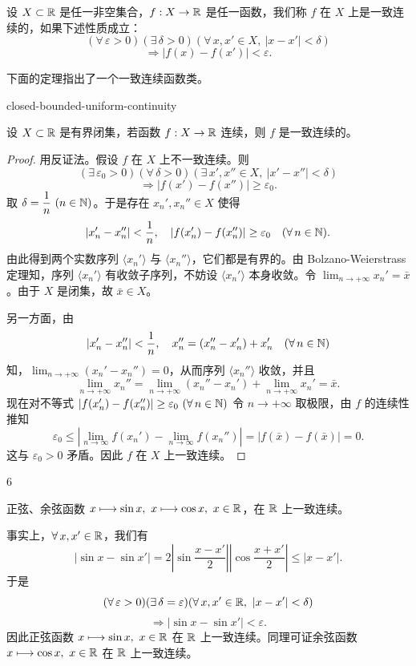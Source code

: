 \begin{mydef*}{}

	设 \(X\subset\mathbb{R}\) 是任一非空集合，\(f:X\to\mathbb{R}\) 是任一函数，我们称 \(f\) 在 \(X\) 上是一致连续的，如果下述性质成立：
	\[
	(\forall\,\varepsilon>0)(\exists\,\delta>0)(\forall\,x,x'\in X,\ |x-x'|<\delta)
	\]
	\[
	\Longrightarrow|f(x)-f(x')|<\varepsilon.
	\]

\end{mydef*}

下面的定理指出了一个一致连续函数类。

\begin{mythm}{}{closed-bounded-uniform-continuity}

	设 \(X\subset\mathbb{R}\) 是有界闭集，若函数 \(f:X\to\mathbb{R}\) 连续，则 \(f\) 是一致连续的。

\end{mythm}

\begin{proof}

	用反证法。假设 \(f\) 在 \(X\) 上不一致连续。则
	\[
	(\exists\,\varepsilon_0>0)(\forall\,\delta>0)(\exists\,x',x''\in X,\ |x'-x''|<\delta)
	\]
	\[
	\Longrightarrow|f(x')-f(x'')|\ge\varepsilon_0.
	\]
	取 \(\delta=\dfrac1n\ (n\in\N)\)。于是存在 \(x_n',x_n''\in X\) 使得
	\[
	|x_n'-x_n''|<\frac1n,\quad |f(x_n')-f(x_n'')|\ge\varepsilon_0\quad(\forall\,n\in\mathbb{N}).
	\]
	由此得到两个实数序列 \(\langle x_n'\rangle\) 与 \(\langle x_n''\rangle\)，它们都是有界的。由 Bolzano-Weierstrass 定理知，序列 \(\langle x_n'\rangle\) 有收敛子序列，不妨设 \(\langle x_n'\rangle\) 本身收敛。令 \(\lim_{n\to+\infty}x_n'=\bar x\)。由于 \(X\) 是闭集，故 \(\bar x\in X\)。

	另一方面，由
	\[
	|x_n'-x_n''|<\frac1n,\quad x_n''=(x_n''-x_n')+x_n'\quad(\forall\,n\in\mathbb{N})
	\]
	知，\(\lim_{n\to+\infty}(x_n'-x_n'')=0\)，从而序列 \(\langle x_n''\rangle\) 收敛，并且
	\[
	\lim_{n\to+\infty}x_n''=\lim_{n\to+\infty}(x_n''-x_n')+\lim_{n\to+\infty}x_n'=\bar x.
	\]
	现在对不等式 \(|f(x_n')-f(x_n'')|\ge\varepsilon_0\ (\forall\,n\in\N)\) 令 \(n\to+\infty\) 取极限，由 \(f\) 的连续性推知
	\[
	\varepsilon_0\le\left|\lim_{n\to\infty}f(x_n')-\lim_{n\to\infty}f(x_n'')\right|=|f(\bar x)-f(\bar x)|=0.
	\]
	这与 \(\varepsilon_0>0\) 矛盾。因此 \(f\) 在 \(X\) 上一致连续。

\end{proof}

\begin{sourceexample}{6}

	正弦、余弦函数 \(x\longmapsto\sin x,\ x\longmapsto\cos x,\ x\in\R\)，在 \(\mathbb{R}\) 上一致连续。

	事实上，\(\forall\,x,x'\in\mathbb{R}\)，我们有
	\[
	|\sin x-\sin x'|=2\left|\sin\frac{x-x'}2\right|\left|\cos\frac{x+x'}2\right|\le|x-x'|.
	\]
	于是
	\[
	(\forall\,\varepsilon>0)(\exists\,\delta=\varepsilon)(\forall\,x,x'\in\R,\ |x-x'|<\delta)
	\]
	\[
	\Longrightarrow|\sin x-\sin x'|<\varepsilon.
	\]
	因此正弦函数 \(x\longmapsto\sin x,\ x\in\R\) 在 \(\mathbb{R}\) 上一致连续。同理可证余弦函数 \(x\longmapsto\cos x,\ x\in\mathbb{R}\) 在 \(\mathbb{R}\) 上一致连续。

\end{sourceexample}

